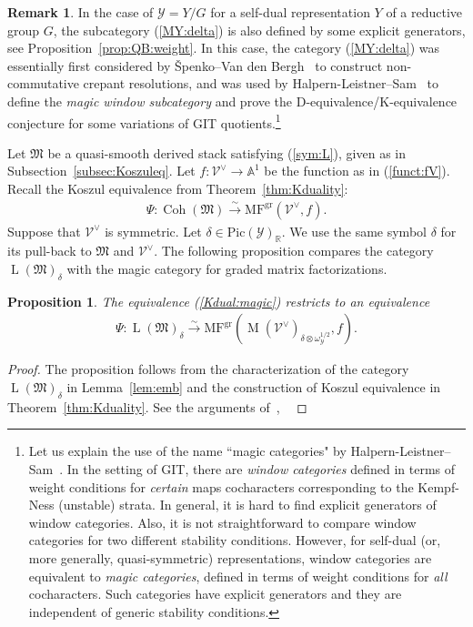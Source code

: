 \documentclass [11pt,oneside,a4paper,mathscr]{amsart}
\newtheorem{prop}[thm]{Proposition}
\theoremstyle{definition}
\newtheorem{remark}[thm]{Remark}
\newcommand{\Y}{\mathcal{Y}}
\newcommand{\LL}{\operatorname{L}}
\newcommand{\MM}{\operatorname{M}}
\newcommand{\Coh}{\operatorname{Coh}}
\begin{document}
\begin{remark}
In the case of $\Y=Y/G$ for a self-dual representation $Y$ of a reductive group $G$, 
the subcategory (\ref{MY:delta}) is also defined by some explicit generators, 
see Proposition~\ref{prop:QB:weight}. 
In this case, the category (\ref{MY:delta}) was 
essentially first considered by \v{S}penko--Van den Bergh~\cite{SvdB} to construct 
 non-commutative crepant resolutions, 
 and was used by Halpern-Leistner--Sam~\cite{hls} to define the \textit{magic window 
 subcategory} and prove the D-equivalence/K-equivalence conjecture for some 
 variations of GIT quotients.\footnote{Let us explain the use of the name ``magic categories" by Halpern-Leistner--Sam~\cite{hls}. In the setting of GIT, there are \textit{window categories} defined in terms of weight conditions for \textit{certain} maps cocharacters corresponding to the Kempf-Ness (unstable) strata. In general, it is hard to find explicit generators of window categories. Also, it is not straightforward to compare window categories for two different stability conditions. However, for self-dual (or, more generally, quasi-symmetric) representations, window categories are equivalent to \textit{magic categories}, defined in terms of weight conditions for \textit{all} cocharacters. Such categories have explicit generators and they are independent of generic stability conditions.}
\end{remark}

Let $\mathfrak{M}$ be a quasi-smooth derived stack satisfying (\ref{sym:L}), given as in 
Subsection~\ref{subsec:Koszuleq}.
Let $f\colon \mathcal{V}^{\vee} \to \mathbb{A}^1$ be the function as in (\ref{funct:fV}). 
Recall the Koszul equivalence from Theorem~\ref{thm:Kduality}:
\begin{align}\label{Kdual:magic}
    \Psi \colon \Coh(\mathfrak{M}) \stackrel{\sim}{\to} \mathrm{MF}^{\mathrm{gr}}(\mathcal{V}^{\vee}, f). 
\end{align}
Suppose that $\mathcal{V}^{\vee}$ is symmetric. 
Let $\delta \in \mathrm{Pic}(\Y)_{\mathbb{R}}$. We use the same symbol $\delta$ 
for its pull-back to $\mathfrak{M}$ and $\mathcal{V}^{\vee}$. 
The following proposition compares the category $\LL(\mathfrak{M})_{\delta}$ with 
the magic category for graded matrix factorizations. 
\begin{prop}\label{prop:comparemagic}
    The equivalence (\ref{Kdual:magic}) restricts to an equivalence 
    \begin{align*}
        \Psi \colon \LL(\mathfrak{M})_{\delta} \stackrel{\sim}{\to} \mathrm{MF}^{\mathrm{gr}}(\MM(\mathcal{V}^{\vee})_{\delta \otimes \omega_{\Y}^{1/2}}, f).
    \end{align*}
\end{prop}
\begin{proof}
The proposition follows from the characterization of the category $\LL(\mathfrak{M})_{\delta}$ in Lemma~\ref{lem:emb} and the construction 
of Koszul equivalence in Theorem~\ref{thm:Kduality}. See 
the arguments of~\cite[Lemma~4.5]{PT0}, ~\cite[Lemma~2.6]{PTquiver}
\end{proof}
\end{document}
